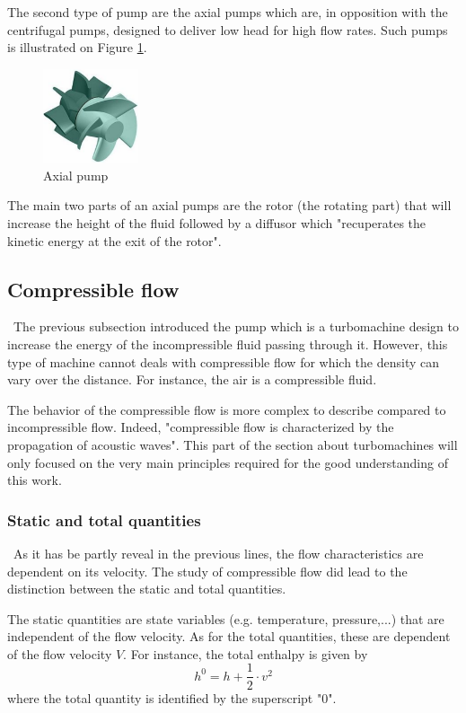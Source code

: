 The second type of pump are the axial pumps which are, in opposition with the centrifugal pumps, designed to deliver low head for high flow rates. Such pumps is illustrated on Figure \ref{fig:C3_axial_pump}. 
\begin{figure}[h!]
\centering
\includegraphics[width=0.25\textwidth]{axial_pump.png}
\caption{Axial pump \citep{Hillewaert2019}}
\label{fig:C3_axial_pump}
\end{figure}

The main two parts of an axial pumps are the rotor (the rotating part) that will increase the height of the fluid followed by a diffusor which "recuperates the kinetic energy at the exit of the rotor"\citep{Hillewaert2019}.

\subsection{Compressible flow}
\quad\, The previous subsection introduced the pump which is a turbomachine design to increase the energy of the incompressible fluid passing through it. However, this type of machine cannot deals with compressible flow for which the density can vary over the distance. For instance, the air is a compressible fluid. 

The behavior of the compressible flow is more complex to describe compared to incompressible flow. Indeed, "compressible flow is characterized by the propagation of acoustic waves"\citep{Hillewaert2019}.   This part of the section about turbomachines will only focused on the very main principles required for the good understanding of this work.

\subsubsection{Static and total quantities}
\quad\, As it has be partly reveal in the previous lines, the flow characteristics are dependent on its velocity. The study of compressible flow did lead to the distinction between the static and total quantities. 

The static quantities are state variables (e.g. temperature, pressure,...) that are independent of the flow velocity. As for the total quantities, these are dependent of the flow velocity $V$. For instance, the total enthalpy is given by
\begin{equation}
h^0 = h + \frac{1}{2}\cdot v^2\label{eq:C3_h0}
\end{equation}
where the total quantity is identified by the superscript "0".

